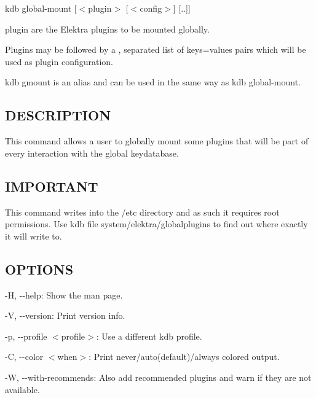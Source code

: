 {\ttfamily kdb global-\/mount \mbox{[}$<$plugin$>$ \mbox{[}$<$config$>$\mbox{]} \mbox{[}..\mbox{]}\mbox{]}}


\begin{DoxyItemize}
\item {\ttfamily plugin} are the Elektra plugins to be mounted globally.
\item Plugins may be followed by a {\ttfamily ,} separated list of {\ttfamily keys=values} pairs which will be used as plugin configuration.
\end{DoxyItemize}

{\ttfamily kdb gmount} is an alias and can be used in the same way as {\ttfamily kdb global-\/mount}.

\subsection*{D\+E\+S\+C\+R\+I\+P\+T\+I\+ON}

This command allows a user to globally mount some plugins that will be part of every interaction with the global keydatabase.

\subsection*{I\+M\+P\+O\+R\+T\+A\+NT}

This command writes into the {\ttfamily /etc} directory and as such it requires root permissions. Use {\ttfamily kdb file system/elektra/globalplugins} to find out where exactly it will write to.

\subsection*{O\+P\+T\+I\+O\+NS}


\begin{DoxyItemize}
\item {\ttfamily -\/H}, {\ttfamily -\/-\/help}\+: Show the man page.
\item {\ttfamily -\/V}, {\ttfamily -\/-\/version}\+: Print version info.
\item {\ttfamily -\/p}, {\ttfamily -\/-\/profile $<$profile$>$}\+: Use a different kdb profile.
\item {\ttfamily -\/C}, {\ttfamily -\/-\/color $<$when$>$}\+: Print never/auto(default)/always colored output.
\item {\ttfamily -\/W}, {\ttfamily -\/-\/with-\/recommends}\+: Also add recommended plugins and warn if they are not available.
\end{DoxyItemize}

